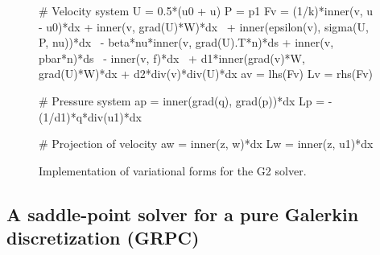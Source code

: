 \begin{figure}
  \codesize
  \begin{center}
    \begin{python}
# Velocity system
U = 0.5*(u0 + u)
P = p1
Fv = (1/k)*inner(v, u - u0)*dx + inner(v, grad(U)*W)*dx \
   + inner(epsilon(v), sigma(U, P, nu))*dx \
   - beta*nu*inner(v, grad(U).T*n)*ds + inner(v, pbar*n)*ds \
   - inner(v, f)*dx \
   + d1*inner(grad(v)*W, grad(U)*W)*dx + d2*div(v)*div(U)*dx
av = lhs(Fv)
Lv = rhs(Fv)

# Pressure system
ap = inner(grad(q), grad(p))*dx
Lp = -(1/d1)*q*div(u1)*dx

# Projection of velocity
aw = inner(z, w)*dx
Lw = inner(z, u1)*dx
    \end{python}
    \caption{Implementation of variational forms for the G2 solver.}
    \label{fig:g2_code}
  \end{center}
\end{figure}

\subsection{A saddle-point solver for a pure Galerkin discretization (GRPC)}

